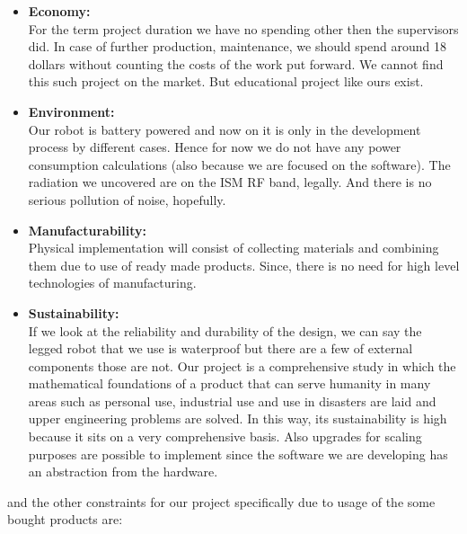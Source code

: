 \documentclass[12pt]{article}
\begin{document}
    \begin{itemize}
        \item \textbf{Economy:} \\
        For the term project duration we have no spending other then the supervisors did. In case of further production, maintenance, we should spend around 18 dollars without counting the costs of the work put forward. We cannot find this such project on the market. But educational project like ours exist.
          
        \item \textbf{Environment:} \\
        Our robot is battery powered and now on it is only in the development process by different cases. Hence for now we do not have any power consumption calculations (also because we are focused on the software). The radiation we uncovered are on the ISM RF band, legally. And there is no serious pollution of noise, hopefully.

        \item \textbf{Manufacturability:} \\
        Physical implementation will consist of collecting materials and combining them due to use of ready made products. Since, there is no need for high level technologies of manufacturing.

        \item \textbf{Sustainability:} \\
        If we look at the reliability and durability of the design, we can say the legged robot that we use is waterproof but there are a few of external components those are not. Our project is a comprehensive study in which the mathematical foundations of a product that can serve humanity in many areas such as personal use, industrial use and use in disasters are laid and upper engineering problems are solved. In this way, its sustainability is high because it sits on a very comprehensive basis. Also upgrades for scaling purposes are possible to implement since the software we are developing has an abstraction from the hardware. 
        
    \end{itemize}

    and the other constraints for our project specifically due to usage of the some bought products are:
\end{document}
